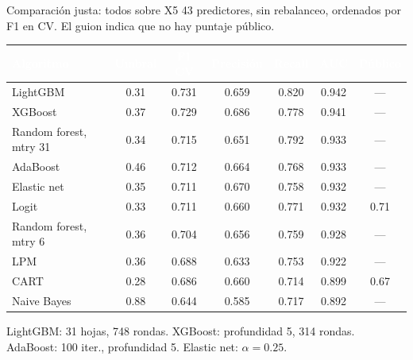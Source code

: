 \documentclass[aspectratio=169,10pt]{beamer}
\newcommand{\mejor}{\rowcolor{uniandesYellow}}
\newcommand{\fila}{\rowcolor{rowAlt}}
\newcommand{\hh}[1]{\cellcolor{uniandesInk}\textcolor{white}{\textbf{#1}}}
\renewcommand{\arraystretch}{1.12}
\begin{document}
\begin{frame}{Comparación justa: todos sobre X5}
  43 predictores, sin rebalanceo, ordenados por F1 en CV. El guion indica que no hay puntaje público.
  \vspace{0.12em}
  \footnotesize
  \renewcommand{\arraystretch}{1.0}
  \begin{center}
  \begin{tabular}{@{}lcccccc@{}}
    \toprule
    \hh{Algoritmo} & \hh{Umbral} & \hh{F1 CV} & \hh{Precisión} & \hh{Recall} & \hh{AUC} & \hh{Público} \\
    \midrule
    \mejor LightGBM & 0.31 & 0.731 & 0.659 & 0.820 & 0.942 & --- \\
    XGBoost & 0.37 & 0.729 & 0.686 & 0.778 & 0.941 & --- \\
    \fila Random forest, mtry 31 & 0.34 & 0.715 & 0.651 & 0.792 & 0.933 & --- \\
    AdaBoost & 0.46 & 0.712 & 0.664 & 0.768 & 0.933 & --- \\
    \fila Elastic net & 0.35 & 0.711 & 0.670 & 0.758 & 0.932 & --- \\
    Logit & 0.33 & 0.711 & 0.660 & 0.771 & 0.932 & 0.71 \\
    \fila Random forest, mtry 6 & 0.36 & 0.704 & 0.656 & 0.759 & 0.928 & --- \\
    LPM & 0.36 & 0.688 & 0.633 & 0.753 & 0.922 & --- \\
    \fila CART & 0.28 & 0.686 & 0.660 & 0.714 & 0.899 & 0.67 \\
    Naive Bayes & 0.88 & 0.644 & 0.585 & 0.717 & 0.892 & --- \\
    \bottomrule
  \end{tabular}
  \end{center}
  \vspace{0.12em}
  {\scriptsize LightGBM: 31 hojas, 748 rondas. XGBoost: profundidad 5, 314 rondas. AdaBoost: 100 iter., profundidad 5. Elastic net: $\alpha=0.25$.}
\end{frame}
\end{document}
